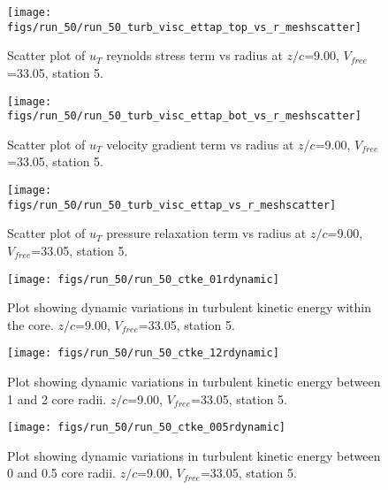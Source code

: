 \begin{figure}[H]
\centering
\texttt{[image: figs/run\_50/run\_50\_turb\_visc\_ettap\_top\_vs\_r\_meshscatter]}
\caption{Scatter plot of $
u_T$ reynolds stress term vs radius at $z/c$=9.00, $V_{free}$=33.05, station 5.}
\label{fig:run_50_turb_visc_ettap_top_vs_r_meshscatter}
\end{figure}


\begin{figure}[H]
\centering
\texttt{[image: figs/run\_50/run\_50\_turb\_visc\_ettap\_bot\_vs\_r\_meshscatter]}
\caption{Scatter plot of $
u_T$ velocity gradient term vs radius at $z/c$=9.00, $V_{free}$=33.05, station 5.}
\label{fig:run_50_turb_visc_ettap_bot_vs_r_meshscatter}
\end{figure}


\begin{figure}[H]
\centering
\texttt{[image: figs/run\_50/run\_50\_turb\_visc\_ettap\_vs\_r\_meshscatter]}
\caption{Scatter plot of $
u_T$ pressure relaxation term vs radius at $z/c$=9.00, $V_{free}$=33.05, station 5.}
\label{fig:run_50_turb_visc_ettap_vs_r_meshscatter}
\end{figure}


\begin{figure}[H]
\centering
\texttt{[image: figs/run\_50/run\_50\_ctke\_01rdynamic]}
\caption{Plot showing dynamic variations in turbulent kinetic energy within the core. $z/c$=9.00, $V_{free}$=33.05, station 5.}
\label{fig:run_50_ctke_01rdynamic}
\end{figure}


\begin{figure}[H]
\centering
\texttt{[image: figs/run\_50/run\_50\_ctke\_12rdynamic]}
\caption{Plot showing dynamic variations in turbulent kinetic energy between 1 and 2 core radii. $z/c$=9.00, $V_{free}$=33.05, station 5.}
\label{fig:run_50_ctke_12rdynamic}
\end{figure}


\begin{figure}[H]
\centering
\texttt{[image: figs/run\_50/run\_50\_ctke\_005rdynamic]}
\caption{Plot showing dynamic variations in turbulent kinetic energy between 0 and 0.5 core radii. $z/c$=9.00, $V_{free}$=33.05, station 5.}
\label{fig:run_50_ctke_005rdynamic}
\end{figure}


